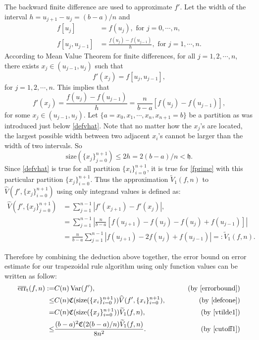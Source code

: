 \documentclass{iitthesis}
\DeclareMathOperator{\Var}{Var}
\theoremstyle{definition}
\theoremstyle{remark}
\begin{document}

The backward finite difference are used to approximate $f'$. Let the width of the interval $h=u_{j+1}-u_{j}=(b-a)/n$ and
\begin{align*}
  f[u_{j}]&=f(u_{j}), \text{ for } j=0,\cdots, n,\\
  f[u_{j},u_{j-1}]&=\frac{f(u_{j})-f(u_{j-1})}{h},\text{ for } j=1, \cdots, n.
\end{align*}
According to Mean Value Theorem for finite differences, for all $j=1,2,\cdots,n$, there exists $x_j\in (u_{j-1},u_{j})$ such that
\begin{equation*}
   f'(x_j)= f[u_{j},u_{j-1}],
\end{equation*}
for $j = 1, 2, \cdots, n.$ This implies that
\begin{equation}\label{fprime}
  f'(x_j)=\frac{f(u_{j})-f(u_{j-1})}{h}=\frac{n}{b-a}[f(u_{j})-f(u_{j-1})],
\end{equation}
for some $x_j\in (u_{j-1},u_{j})$. Let $\{a=x_{0}, x_{1},\cdots,x_{n},x_{n+1}=b\}$ be a partition as was introduced just below \eqref{defvhat}. Note that no matter how the $x_j$'s are located, the largest possible width between two adjacent $x_{i}$'s cannot be larger than the width of two intervals. So
\begin{equation}\label{cutoff1}
  \text{size}(\{x_j\}_{j=0}^{n+1})\leq 2h=2(b-a)/n<\mathfrak{h}.
\end{equation}
Since \eqref{defvhat} is true for all partition $\{x_i\}_{i=0}^{n+1}$, it is true for \eqref{fprime} with this particular partition $\{x_j\}_{i=0}^{n+1}$. Thus the approximation $\widetilde{V}_1(f,n)$ to $\widehat{V}(f',\{x_j\}_{i=0}^{n+1})$ using only integrand values is defined as:
\begin{align}\label{vtilde1}
\nonumber    \widehat{V}(f',\{x_j\}_{j=0}^{n+1})&= \sum_{j=1}^{n-1}\left|f'(x_{j+1})-f'(x_{j})\right|,\\
\nonumber    &=\sum_{j=1}^{n-1}\left|\frac{n}{b-a}[f(u_{j+1})-f(u_{j})-f(u_{j})+f(u_{j-1})]\right|\\
    &=\frac{n}{b-a}\sum_{j=1}^{n-1}\left|f(u_{j+1})-2f(u_{j})+f(u_{j-1})\right|=:\widetilde{V}_1(f,n).
\end{align}

Therefore by combining the deduction above together, the error bound on error estimate for our trapezoidal rule algorithm using only function values can be written as follow:
\begin{align*}
\overline{\text{err}}_{\text{t}}(f,n):=&C(n)\Var(f'),\qquad &\text{ (by \eqref{errorbound})}\\
\leq & C(n)\mathfrak{C}(\text{size}(\{x_i\}_{i=0}^{n+1}))\widehat{V}(f',\{x_i\}_{i=0}^{n+1}), \qquad &\text{ (by \eqref{defcone})}\\
=& C(n)\mathfrak{C}(\text{size}(\{x_j\}_{i=0}^{n+1}))\widetilde{V}_1(f,n), \qquad &\text{ (by \eqref{vtilde1})}\\
  \leq & \frac{(b-a)^2\mathfrak{C}(2(b-a)/n)\widetilde{V}_1(f,n)}{8n^2}.\qquad &\text{ (by \eqref{cutoff1})}
\end{align*}
\end{document}
